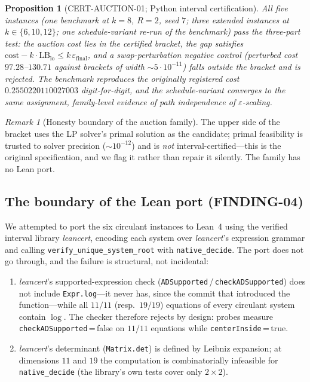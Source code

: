 \documentclass[11pt]{article}
\newtheorem{proposition}[theorem]{Proposition}
\theoremstyle{definition}
\theoremstyle{remark}
\newtheorem{remark}[theorem]{Remark}
\newcommand{\lean}[1]{\texttt{#1}}
\begin{document}
\begin{proposition}[CERT-AUCTION-01; Python interval certification]
\label{prop:auction}
All five instances (one benchmark at $k=8$, $R=2$, seed $7$; three extended
instances at $k\in\{6,10,12\}$; one schedule-variant re-run of the
benchmark) pass the three-part test: the auction cost lies in the certified
bracket, the gap satisfies $\mathrm{cost}-k\cdot\mathrm{LB}_{\mathrm{lo}}\le
k\,\varepsilon_{\mathrm{final}}$, and a swap-perturbation negative control
(perturbed cost $97.28$--$130.71$ against brackets of width
$\sim 5\cdot10^{-11}$) falls outside the bracket and is rejected. The
benchmark reproduces the originally registered cost
$0.2550220110027003$ digit-for-digit, and the schedule-variant converges to
the same assignment, family-level evidence of path independence of
$\varepsilon$-scaling.
\end{proposition}

\begin{remark}[Honesty boundary of the auction family]\label{rem:auction-honest}
The upper side of the bracket uses the LP solver's primal solution as the
candidate; primal feasibility is trusted to solver precision
($\sim 10^{-12}$) and is \emph{not} interval-certified---this is the original
specification, and we flag it rather than repair it silently. The family has
no Lean port.
\end{remark}

\subsection{The boundary of the Lean port (FINDING-04)}\label{sec:finding04}

We attempted to port the six circulant instances to Lean~4 using the verified
interval library \emph{leancert}, encoding each system over \emph{leancert}'s
expression grammar and calling
\lean{verify\_unique\_system\_root} with \texttt{native\_decide}. The port
does not go through, and the failure is structural, not incidental:

\begin{enumerate}
\item \emph{leancert}'s supported-expression check
(\lean{ADSupported}\,/\,\lean{checkADSupported}) does not include
\lean{Expr.log}---it never has, since the commit that introduced the
function---while all $11/11$ (resp.\ $19/19$) equations of every circulant
system contain $\log$. The checker therefore rejects by design: probes
measure \lean{checkADSupported}\,=\,false on $11/11$ equations while
\lean{centerInside}\,=\,true.
\item \emph{leancert}'s determinant (\lean{Matrix.det}) is defined by
Leibniz expansion; at dimensions $11$ and $19$ the computation is
combinatorially infeasible for \texttt{native\_decide} (the library's own
tests cover only $2\times 2$).
\end{enumerate}
\end{document}
